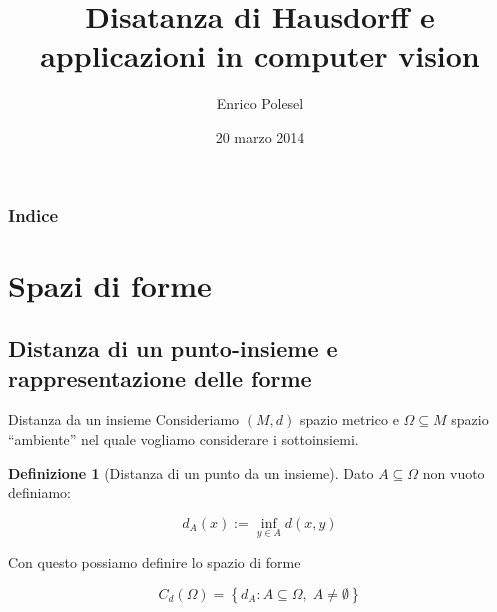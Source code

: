 \documentclass{beamer}
\title[Distanza di Hausdorff]{Disatanza di Hausdorff e applicazioni
  in computer vision}
\author{Enrico Polesel}
\institute[Scuola Normale Superiore]{Scuola Normale Superiore}
\date{20 marzo 2014}
\newcounter{counter1}
\theoremstyle{plain}
\theoremstyle{definition}
\newtheorem{mydef}[counter1]{Definizione}
\theoremstyle{remark}
\newcommand{\set}[1]{\left\{#1\right\}}
\begin{document}
\begin{frame}[plain]
  \titlepage
\end{frame}

\begin{frame}[plain]
 \frametitle{Indice}
 \tableofcontents
\end{frame}




\AtBeginSubsection[]
{
  \begin{frame}[plain]{\secname $\rightarrow$ \subsecname}
    \tableofcontents[currentsubsection]
  \end{frame}
}

\section{Spazi di forme}

\subsection{Distanza di un punto-insieme e rappresentazione delle forme}


\begin{frame}{Distanza da un insieme}
  Consideriamo $(M,d)$ spazio metrico e $\Omega \subseteq M$ spazio
  ``ambiente'' nel quale vogliamo considerare i sottoinsiemi.
  
  \begin{mydef}[Distanza di un punto da un insieme]
    Dato $A \subseteq \Omega$ non vuoto definiamo:
    
    \[  d_A (x) := \inf _{y \in A} d(x,y) \] 
  \end{mydef}
  
  Con questo possiamo definire lo spazio di forme
  
  \[ C_d(\Omega) = \set{d_A : A \subseteq \Omega,\; A \neq \emptyset} \]
\end{frame}
\end{document}
